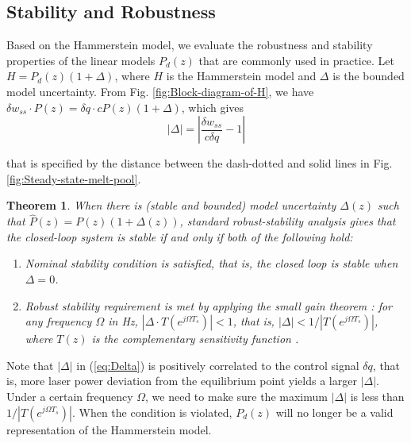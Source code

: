 \documentclass [11pt, proquest] {uwthesis}[2020/02/24]
\newtheorem{theorem}{Theorem}
\begin{document}
\subsection{Stability and Robustness} \label{subsec:Stability-and-Robustness}

Based on the Hammerstein model, we evaluate the robustness and stability
properties of the linear models $P_{d}(z)$ that are commonly used
in practice. Let $H=P_{d}(z)(1+\Delta)$, where $H$ is the Hammerstein
model and $\Delta$ is the bounded model uncertainty. From Fig. \ref{fig:Block-diagram-of-H},
we have $\delta w_{ss}\cdot P(z)=\delta q\cdot cP(z)(1+\Delta)$,
which gives
\begin{equation}
\left|\Delta\right|=\left|\frac{\delta w_{ss}}{c\delta q}-1\right|\label{eq:Delta}
\end{equation}

\noindent that is specified by the distance between the dash-dotted
and solid lines in Fig. \ref{fig:Steady-state-melt-pool}.

\begin{theorem} \label{thm:small-gain-theorem}
When there is (stable and bounded) model uncertainty $\Delta(z)$
such that $\hat{P}(z)=P(z)(1+\Delta(z))$, standard robust-stability
analysis\cite{chen2013selective} gives that the closed-loop system is stable if and only if both of the following
hold:
\begin{enumerate}
\item Nominal stability condition is satisfied, that is, the closed loop
is stable when $\Delta=0$.
\item Robust stability requirement is met by applying the small gain theorem
\cite{doyle2013feedback}: for any frequency $\Omega$ in Hz, $\left|\Delta\cdot T(e^{j\Omega T_{s}})\right|<1$,
that is, $\left|\Delta\right|<1/\left|T(e^{j\Omega T_{s}})\right|$,
where $T(z)$ is the complementary sensitivity function \cite{wang2018multirate}.
\end{enumerate}
\end{theorem}

Note that $\left|\Delta\right|$ in (\ref{eq:Delta}) is positively
correlated to the control signal $\delta q$, that is, more laser
power deviation from the equilibrium point yields a larger $\left|\Delta\right|$.
Under a certain frequency $\Omega$, we need to make sure the maximum
$\left|\Delta\right|$ is less than $1/\left|T(e^{j\Omega T_{s}})\right|$.
When the condition is violated, $P_{d}(z)$ will no longer be a valid
representation of the Hammerstein model.
\end{document}
